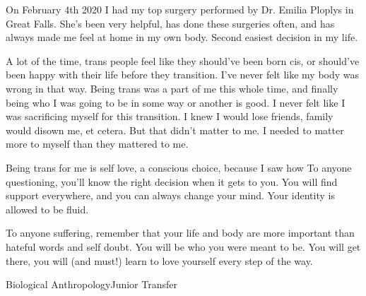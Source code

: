 {On February 4th 2020 I had my top surgery performed by Dr. Emilia Ploplys in 
Great Falls. She's been very helpful, has done these surgeries often, and has
always made me feel at home in my own body. Second easiest decision in my life.

A lot of the time, trans people feel like they should've been born cis, or
should've been happy with their life before they transition. I've never felt
like my body was wrong in that way. Being trans was a part of me this whole
time, and finally being who I was going to be in some way or another is good. I
never felt like I was sacrificing myself for this transition. I knew I would
lose friends, family would disown me, et cetera. But that didn't matter to me.
I needed to matter more to myself than they mattered to me.

Being trans for me is self love, a conscious choice, because I saw how
To anyone questioning, you'll know the right decision when it gets to you. You
will find support everywhere, and you can always change your mind. Your
identity is allowed to be fluid.

To anyone suffering, remember that your life and body are more important than
hateful words and self doubt. You will be who you were meant to be. You will
get there, you will (and must!) learn to love yourself every step of the way.}
{\he}{Biological Anthropology}{Junior Transfer}
{} %
